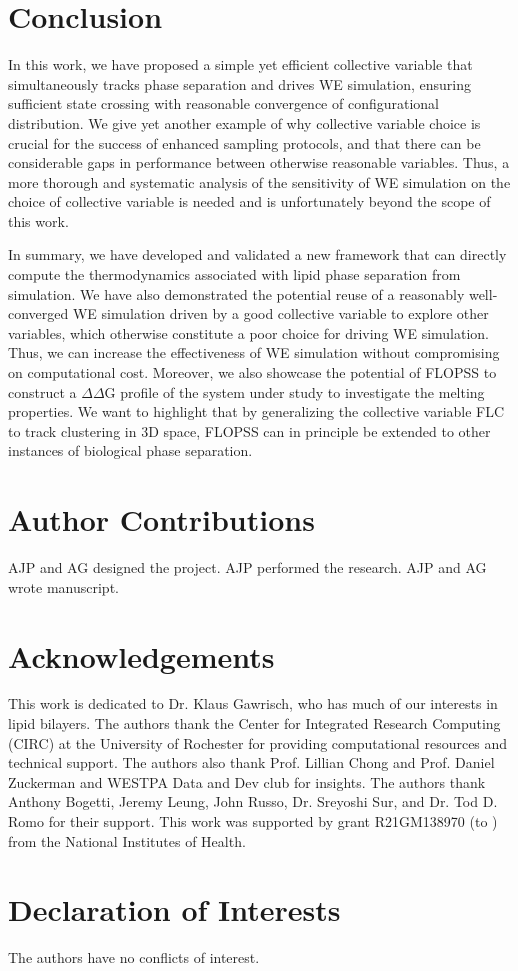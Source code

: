 \documentclass{biophys-new}
\providecommand{\DIFaddtex}[1]{{\protect\color{blue}\uwave{#1}}} %
\providecommand{\DIFaddbegin}{} %
\providecommand{\DIFaddend}{} %
\providecommand{\DIFadd}[1]{\texorpdfstring{\DIFaddtex{#1}}{#1}} %
\newcommand{\DIFaddincludegraphics}[2][]{{\color{blue}\fbox{\DIFOincludegraphics[#1]{#2}}}} %
\DeclareRobustCommand{\DIFaddbegin}{\DIFOaddbegin \let\includegraphics\DIFaddincludegraphics} %
\DeclareRobustCommand{\DIFaddend}{\DIFOaddend \let\includegraphics\DIFOincludegraphics} %
\begin{document}
\section*{Conclusion}

In this work, we have proposed a simple yet efficient collective variable that
simultaneously tracks phase separation and drives WE simulation, ensuring
sufficient state crossing with reasonable convergence of configurational
distribution. We give yet another example of why collective variable choice is
crucial for the success of enhanced sampling protocols, and that there can be
considerable gaps in performance between otherwise reasonable variables. Thus,
a more thorough and systematic analysis of the sensitivity of WE simulation on
the choice of collective variable is needed and is unfortunately beyond the
scope of this work.

In summary, we have developed and validated a new framework that can directly compute the thermodynamics associated with lipid phase separation from simulation.
We have also demonstrated the potential reuse of a reasonably well-converged WE simulation driven by a good collective variable to explore other variables, which otherwise constitute a poor choice for driving WE simulation.
Thus, we can increase the effectiveness of WE simulation without compromising on computational cost.
Moreover, we also showcase the potential of FLOPSS to construct a $\Delta\Delta$G profile of the system under study to investigate the melting properties.
We want to highlight that by generalizing the collective variable FLC to track clustering in 3D space, FLOPSS can in principle be extended to other instances of biological phase separation.

\section*{Author Contributions}

AJP and AG designed the project. AJP \DIFaddbegin \DIFadd{and AS }\DIFaddend performed the research. AJP and AG wrote manuscript.

\section*{Acknowledgements}

This work is dedicated to Dr. Klaus Gawrisch, who has  \DIFaddbegin \DIFadd{inspired }\DIFaddend much of our interests in lipid bilayers. The authors thank the Center for Integrated Research Computing (CIRC) at the University of Rochester for providing
computational resources and technical support. The authors also thank Prof. Lillian Chong and Prof. Daniel Zuckerman and
\DIFaddbegin \DIFadd{the }\DIFaddend WESTPA Data and Dev club for insights. The authors thank Anthony Bogetti, Jeremy Leung, John Russo, Dr. Sreyoshi Sur, and Dr. Tod D. Romo for their support.
This work was supported by grant R21GM138970 (to  \DIFaddbegin \DIFadd{AG}\DIFaddend ) from the National Institutes of Health.

\section*{Declaration of Interests}

The authors have no conflicts of interest.


\end{document}

